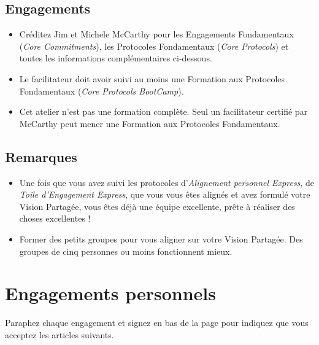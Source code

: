 \documentclass[paper=6in:9in,pagesize=pdftex,headinclude=on,footinclude=on,12pt]{scrbook}
\begin{document}
\subsection{Engagements}
\begin{itemize}
	\item Créditez Jim et Michele McCarthy pour les Engagements Fondamentaux (\emph{Core Commitments}), les Protocoles Fondamentaux (\emph{Core Protocols}) et toutes les
	      informations complémentaires ci-dessous.
	\item Le facilitateur doit avoir suivi au moins une Formation aux Protocoles Fondamentaux (\emph{Core Protocols BootCamp}).
	\item Cet atelier n'est pas une formation complète. Seul un facilitateur certifié par McCarthy peut mener une Formation aux Protocoles Fondamentaux.
\end{itemize}

\subsection{Remarques}
\begin{itemize}
	\item Une fois que vous avez suivi les protocoles d'\emph{Alignement personnel Express}, de \emph{Toile d'Engagement Express}, que vous vous êtes alignés et avez formulé
	      votre Vision Partagée, vous êtes déjà une équipe excellente, prête à réaliser des choses excellentes !
	\item Former des petits groupes pour vous aligner sur votre Vision Partagée. Des groupes de cinq personnes ou moins fonctionnent mieux.
\end{itemize}

\section{Engagements personnels} \label{engagements-personnels}

Paraphez chaque engagement et signez en bas de la page pour indiquez que vous acceptez les articles suivants.
\end{document}
